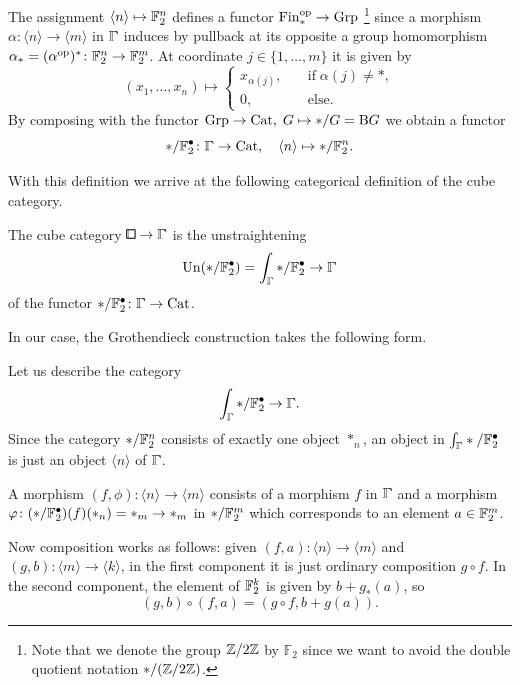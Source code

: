 \begin{definition}
The assignment $\langle n\rangle\mapsto\mathbb{F}_2^n$ defines a functor $\mathrm{Fin}_\ast^{\mathrm{op}}\to\mathrm{Grp}$%
\footnote{Note that we denote the group $\mathbb{Z}/2\mathbb{Z}$ by $\mathbb{F}_2$
since we want to avoid the double quotient notation $\ast/(\mathbb{Z}/2\mathbb{Z})$.}
since a morphism $\alpha\colon\langle n\rangle\to\langle m\rangle$ in $\bbGamma$ induces
by pullback at its opposite a group homomorphism $\alpha_\ast=(\alpha^{\mathrm{op}})^\ast\colon\mathbb{F}_2^n\to\mathbb{F}_2^m$.
At coordinate $j\in\{1,\ldots,m\}$ it is given by
\[
    (x_1,\ldots,x_n)\mapsto\begin{cases}
                                x_{\alpha(j)},\quad&\text{if}\;\alpha(j)\neq\ast, \\
                                0,\quad&\text{else}.
                            \end{cases}
\]
By composing with the functor $\mathrm{Grp}\to\mathrm{Cat},\;G\mapsto */G=\mathrm{B}G$ we obtain a functor
\[
    \ast/\F_2^\bullet\colon\bbGamma\to\Cat,\quad\langle n\rangle\mapsto\ast/\F_2^n.
\]
\end{definition}

With this definition we arrive at the following categorical definition of the cube category.

\begin{proposition}\label{prop:cube_cat_linear}
The cube category $\bbox\to\bbGamma$ is the unstraightening
\[
    \mathrm{Un}(\ast/\F_2^\bullet)=\int_{\bbGamma} \ast/\F_2^\bullet\to\bbGamma
\]
of the functor $\ast/\F_2^\bullet\colon\bbGamma\to\Cat$.
\end{proposition}

In our case, the Grothendieck construction takes the following form.

\begin{remark}
Let us describe the category
\[
    \int_{\bbGamma} \ast/\F_2^\bullet\to\bbGamma.
\]
Since the category $\ast/\mathbb{F}_2^n$ consists of exactly one object $\ast_n$,
an object in ${\int_{\bbGamma}} \ast/\F_2^\bullet$ is just an object $\langle n\rangle$ of $\bbGamma$.

A morphism $(f,\phi)\colon\langle n\rangle\to\langle m\rangle$ consists of a morphism $f$ in $\bbGamma$
and a morphism $\varphi\colon(\ast/\mathbb{F}_2^\bullet)(f)(\ast_n)=\ast_m\to\ast_m$ in $\ast/\mathbb{F}_2^m$ which corresponds to an element $a\in\mathbb{F}_2^m$.

Now composition works as follows: given $(f,a)\colon\langle n\rangle\to\langle m\rangle$
and $(g,b)\colon\langle m\rangle\to\langle k\rangle$, in the first component it is just ordinary composition $g\circ f$.
In the second component, the element of $\mathbb{F}_2^k$ is given by $b+g_\ast(a)$, so
\[
    (g,b)\circ(f,a)=(g\circ f, b+g(a)).
\]
\end{remark}

